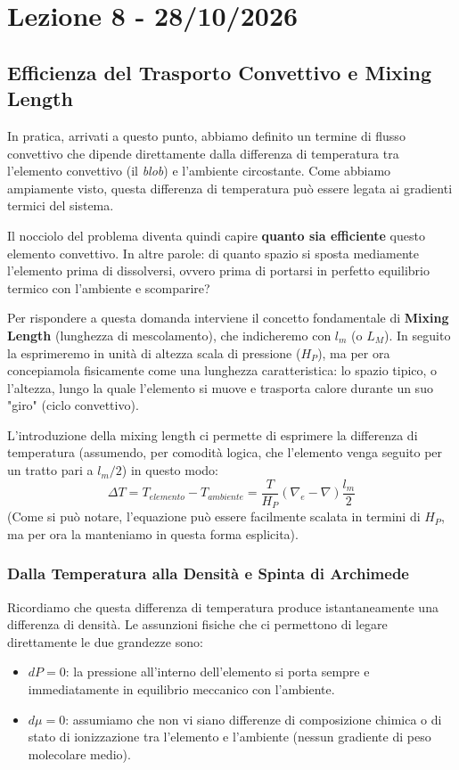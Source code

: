 \chapter{Lezione 8 - 28/10/2026}

\section{Efficienza del Trasporto Convettivo e Mixing Length}

In pratica, arrivati a questo punto, abbiamo definito un termine di flusso convettivo che dipende direttamente dalla differenza di temperatura tra l'elemento convettivo (il \textit{blob}) e l'ambiente circostante. Come abbiamo ampiamente visto, questa differenza di temperatura può essere legata ai gradienti termici del sistema.

Il nocciolo del problema diventa quindi capire \textbf{quanto sia efficiente} questo elemento convettivo. In altre parole: di quanto spazio si sposta mediamente l'elemento prima di dissolversi, ovvero prima di portarsi in perfetto equilibrio termico con l'ambiente e scomparire?

Per rispondere a questa domanda interviene il concetto fondamentale di \textbf{Mixing Length} (lunghezza di mescolamento), che indicheremo con $l_m$ (o $L_M$). In seguito la esprimeremo in unità di altezza scala di pressione ($H_P$), ma per ora concepiamola fisicamente come una lunghezza caratteristica: lo spazio tipico, o l'altezza, lungo la quale l'elemento si muove e trasporta calore durante un suo "giro" (ciclo convettivo).

L'introduzione della mixing length ci permette di esprimere la differenza di temperatura (assumendo, per comodità logica, che l'elemento venga seguito per un tratto pari a $l_m/2$) in questo modo:
\begin{equation}
\Delta T = T_{elemento} - T_{ambiente} = \frac{T}{H_P} (\nabla_e - \nabla) \frac{l_m}{2}
\end{equation}
(Come si può notare, l'equazione può essere facilmente scalata in termini di $H_P$, ma per ora la manteniamo in questa forma esplicita).

\subsection{Dalla Temperatura alla Densità e Spinta di Archimede}
Ricordiamo che questa differenza di temperatura produce istantaneamente una differenza di densità. Le assunzioni fisiche che ci permettono di legare direttamente le due grandezze sono:
\begin{itemize}
\item $dP = 0$: la pressione all'interno dell'elemento si porta sempre e immediatamente in equilibrio meccanico con l'ambiente.
\item $d\mu = 0$: assumiamo che non vi siano differenze di composizione chimica o di stato di ionizzazione tra l'elemento e l'ambiente (nessun gradiente di peso molecolare medio).
\end{itemize}

